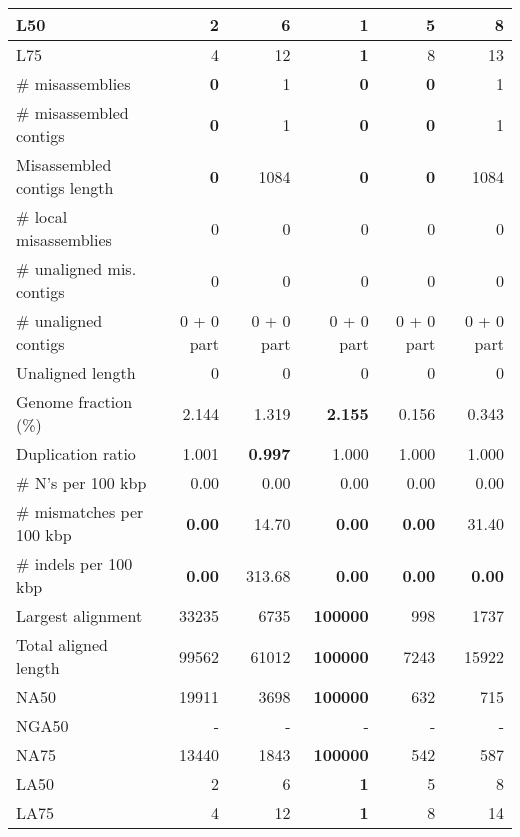 \documentclass[12pt,a4paper]{article}
\begin{document}
\begin{table}[ht]
\begin{center}
\begin{tabular}{|l*{5}{|r}|}
L50 & 2 & 6 & {\bf 1} & 5 & 8 \\ \hline
L75 & 4 & 12 & {\bf 1} & 8 & 13 \\ \hline
\# misassemblies & {\bf 0} & 1 & {\bf 0} & {\bf 0} & 1 \\ \hline
\# misassembled contigs & {\bf 0} & 1 & {\bf 0} & {\bf 0} & 1 \\ \hline
Misassembled contigs length & {\bf 0} & 1084 & {\bf 0} & {\bf 0} & 1084 \\ \hline
\# local misassemblies & 0 & 0 & 0 & 0 & 0 \\ \hline
\# unaligned mis. contigs & 0 & 0 & 0 & 0 & 0 \\ \hline
\# unaligned contigs & 0 + 0 part & 0 + 0 part & 0 + 0 part & 0 + 0 part & 0 + 0 part \\ \hline
Unaligned length & 0 & 0 & 0 & 0 & 0 \\ \hline
Genome fraction (\%) & 2.144 & 1.319 & {\bf 2.155} & 0.156 & 0.343 \\ \hline
Duplication ratio & 1.001 & {\bf 0.997} & 1.000 & 1.000 & 1.000 \\ \hline
\# N's per 100 kbp & 0.00 & 0.00 & 0.00 & 0.00 & 0.00 \\ \hline
\# mismatches per 100 kbp & {\bf 0.00} & 14.70 & {\bf 0.00} & {\bf 0.00} & 31.40 \\ \hline
\# indels per 100 kbp & {\bf 0.00} & 313.68 & {\bf 0.00} & {\bf 0.00} & {\bf 0.00} \\ \hline
Largest alignment & 33235 & 6735 & {\bf 100000} & 998 & 1737 \\ \hline
Total aligned length & 99562 & 61012 & {\bf 100000} & 7243 & 15922 \\ \hline
NA50 & 19911 & 3698 & {\bf 100000} & 632 & 715 \\ \hline
NGA50 & - & - & - & - & - \\ \hline
NA75 & 13440 & 1843 & {\bf 100000} & 542 & 587 \\ \hline
LA50 & 2 & 6 & {\bf 1} & 5 & 8 \\ \hline
LA75 & 4 & 12 & {\bf 1} & 8 & 14 \\ \hline
\end{tabular}
\end{center}
\end{table}
\end{document}
